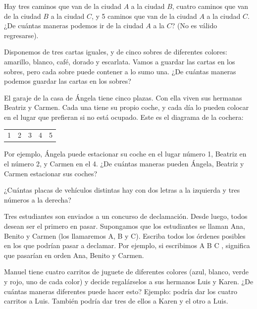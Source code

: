 \begin{ejercicio}
    Hay tres caminos que van de la ciudad $A$ a la ciudad $B$, cuatro caminos que van de la ciudad $B$ a la ciudad $C$, y 5 caminos que van de la ciudad $A$ a la ciudad $C$. ¿De cuántas maneras podemos ir de la ciudad $A$ a la $C$? (No es válido regresarse).
\end{ejercicio}

\begin{ejercicio}
    Disponemos de tres cartas iguales, y de cinco sobres de diferentes colores: amarillo, blanco, café, dorado y escarlata. Vamos a guardar las cartas en los sobres, pero cada sobre puede contener a lo sumo una. ¿De cuántas maneras podemos guardar las cartas en los sobres?
\end{ejercicio}

\begin{ejercicio}
    El garaje de la casa de Ángela tiene cinco plazas. Con ella viven sus hermanas Beatriz y Carmen. Cada una tiene su propio coche, y cada día lo pueden colocar en el lugar que prefieran si no está ocupado. Este es el diagrama de la cochera:

    \begin{center}
        \begin{tabular}{|c|c|c|c|c|}
            1 & 2 & 3 & 4 & 5
        \end{tabular}
    \end{center}

    Por ejemplo, Ángela puede estacionar su coche en el lugar número 1, Beatriz en el número 2, y Carmen en el 4. ¿De cuántas maneras pueden Ángela, Beatriz y Carmen estacionar sus coches?
\end{ejercicio}

\begin{ejercicio}
    ¿Cuántas placas de vehículos distintas hay con dos letras a la izquierda y tres números a la derecha?
\end{ejercicio}

\begin{ejercicio}
    Tres estudiantes son enviados a un concurso de declamación. Desde luego, todos desean ser el primero en pasar. Supongamos que los estudiantes se llaman Ana, Benito y Carmen (los llamaremos A, B y C). Escriba todos los órdenes posibles en los que podrían pasar a declamar. Por ejemplo, si escribimos A B C , significa que pasarían en orden Ana, Benito y Carmen.
\end{ejercicio}

\begin{ejercicio}
    Manuel tiene cuatro carritos de juguete de diferentes colores (azul, blanco, verde y rojo, uno de cada color) y decide regalárselos a sus hermanos Luis y Karen. ¿De cuántas maneras diferentes puede hacer esto? Ejemplo: podría dar los cuatro carritos a Luis. También podría dar tres de ellos a Karen y el otro a Luis.
\end{ejercicio}

